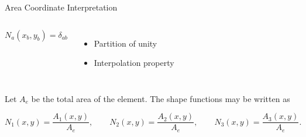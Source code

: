 \documentclass[aspectratio=169]{beamer}
\begin{document}
\begin{frame}{Area Coordinate Interpretation}
\begin{columns}[T,onlytextwidth]
\[
N_a(x_b,y_b)=\delta_{ab}
\]

\medskip

\begin{itemize}
\item Partition of unity
\item Interpolation property
\end{itemize}

\end{columns}

\vspace{4mm}

Let \(A_e\) be the total area of the element.  
The shape functions may be written as

\[
N_1(x,y)=\frac{A_1(x,y)}{A_e},
\qquad
N_2(x,y)=\frac{A_2(x,y)}{A_e},
\qquad
N_3(x,y)=\frac{A_3(x,y)}{A_e}.
\]

\end{frame}
\end{document}

